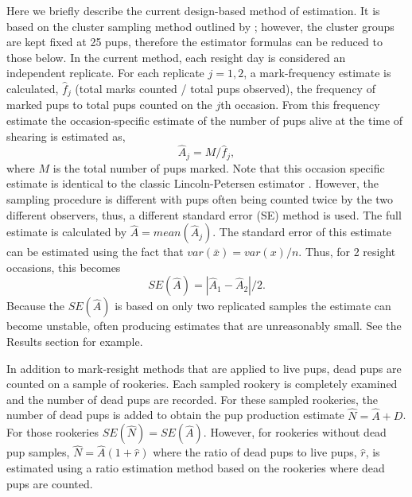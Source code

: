 \documentclass[fleqn,10pt]{wlscirep}
\begin{document}
Here we briefly describe the current design-based method of estimation. It is based on the cluster sampling method outlined by \cite{CHAPMAN:1968ys}; however, the cluster groups are kept fixed at 25 pups, therefore the estimator formulas can be reduced to those below. In the current method, each resight day is considered an independent replicate. For each replicate \(j=1,2\), a mark-frequency estimate is calculated, \(\hat f_{j}\) (total marks counted / total pups observed), the frequency of marked pups to total pups counted on the \(j\)th occasion. From this frequency estimate the occasion-specific estimate of the number of pups alive at the time of shearing is estimated as,
\[
\hat{A}_{j} = M / \hat{f}_{j},
\]
where \(M\) is the total number of pups marked. Note that this occasion specific estimate is identical to the classic Lincoln-Petersen estimator \cite{Lincoln:1930aa}. However, the sampling procedure is different with pups often being counted twice by the two different observers, thus, a different standard error (SE) method is used. The full estimate is calculated by \(\hat{A} = mean(\hat{A}_{j})\). The standard error of this estimate can be estimated using the fact that \(var(\bar x) = var(x)/n\). Thus, for 2 resight occasions, this becomes
\[
SE(\hat A) = |\hat A_{1} - \hat A_{2}|/2.
\]
Because the \(SE(\hat A)\) is based on only two replicated samples the estimate can become unstable, often producing estimates that are unreasonably small. See the Results section for example.

In addition to mark-resight methods that are applied to live pups, dead pups are counted on a sample of rookeries. Each sampled rookery is completely examined and the number of dead pups are recorded. For these sampled rookeries, the number of dead pups is added to obtain the pup production estimate \(\hat{N} = \hat{A} + D\). For those rookeries \(SE(\hat{N}) = SE(\hat{A})\). However, for rookeries without dead pup samples, \(\hat{N} = \hat{A}(1+\hat{r})\) where the ratio of dead pups to live pups, \(\hat{r}\), is estimated using a ratio estimation method \cite{cochran1977sampling} based on the rookeries where dead pups are counted.
\end{document}
